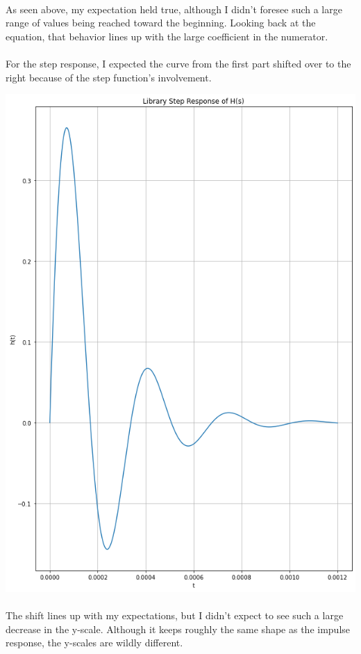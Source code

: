 \documentclass[12pt]{report}
\begin{document}
    \paragraph{} As seen above, my expectation held true, although I didn't foresee such a large range of values being reached toward the beginning. Looking back at the equation, that behavior lines up with the large coefficient in the numerator.
    
    \paragraph{} For the step response, I expected the curve from the first part shifted over to the right because of the step function's involvement. 
    
    \includegraphics[scale=0.6]{step response.png}
    
    \paragraph{} The shift lines up with my expectations, but I didn't expect to see such a large decrease in the y-scale. Although it keeps roughly the same shape as the impulse response, the y-scales are wildly different. 
      
\end{document}
